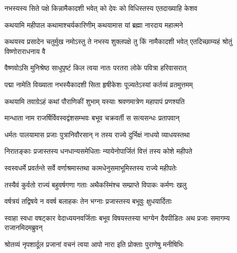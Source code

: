 \hyperref[sec:ekadashi_mahatmyam_padma_puranam]{\closesub}
\clearpage

\label{sec:padma-bhadrapada-shukla-padma}



\twolineshloka
{नभस्यस्य सिते पक्षे किन्नामैकादशी भवेत्}
{को देवः को विधिस्तस्य एतदाख्याहि केशव}%


\twolineshloka
{कथयामि महीपाल कथामाश्चर्यकारिणीम्}
{कथयामास यां ब्रह्मा नारदाय महात्मने}%


\threelineshloka
{कथयस्व प्रसादेन चतुर्मुख नमोऽस्तु ते}
{नभस्य शुक्लपक्षे तु किं नामैकादशी भवेत्}
{एतदिच्छाम्यहं श्रोतुं विष्णोराराधनाय वै}%


\twolineshloka
{वैष्णवोऽसि मुनिश्रेष्ठ साधुपृष्टं किल त्वया}
{नातः परतरा लोके पवित्रा हरिवासरात्}%

\twolineshloka
{पद्मा नामेति विख्याता नभस्यैकादशी सिता}
{हृषीकेशः पूज्यतेऽस्यां कर्तव्यं व्रतमुत्तमम्}%

\twolineshloka
{कथयामि तवाग्रेऽहं कथां पौराणिकीं शुभाम्}
{यस्याः श्रवणमात्रेण महापापं प्रणश्यति}%

\twolineshloka
{मान्धाता नाम राजर्षिर्विवस्वद्वंशसम्भवः}
{बभूव चक्रवर्ती स सत्यसन्धः प्रतापवान्}%

\twolineshloka
{धर्मतः पालयामास प्रजाः पुत्रानिवौरसान्}
{न तस्य राज्ये दुर्भिक्षं नाधयो व्याधयस्तथा}%

\twolineshloka
{निरातङ्काः प्रजास्तस्य धनधान्यसमेधिताः}
{न्यायेनोपार्जितं वित्तं तस्य कोशे महीपते}%

\twolineshloka
{स्वस्वधर्मे प्रवर्तन्ते सर्वे वर्णाश्रमास्तथा}
{कामधेनुसमाभूमिस्तस्य राज्ये महीपतेः}%

\twolineshloka
{तस्यैवं कुर्वतो राज्यं बहुवर्षगणा गताः}
{अथैकस्मिंश्च सम्प्राप्ते विपाकः कर्मणः खलु}%

\twolineshloka
{वर्षत्रयं तद्विषये न ववर्ष बलाहकः}
{तेन भग्नाः प्रजास्तस्य बभूवुः क्षुधयार्दिताः}%

\threelineshloka
{स्वाहा स्वधा वषट्कार वेदाध्ययनवर्जिताः}
{बभूव विषयस्तस्या भाग्येन दैवपीडितः}
{अथ प्रजाः समागम्य राजानमिदमब्रुवन्}%


\twolineshloka
{श्रोतव्यं नृपशार्दूल प्रजानां वचनं त्वया}
{आपो नारा इति प्रोक्ताः पुराणेषु मनीषिभिः}%

